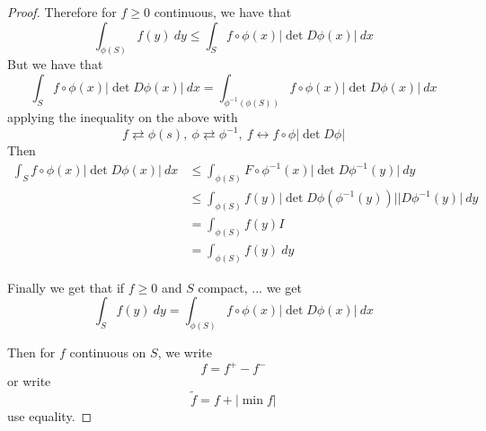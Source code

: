 \documentclass[11pt,a4paper]{article}
\theoremstyle{definition}
\theoremstyle{plain}
\theoremstyle{remark}
\newcommand{\abs}[1]{\lvert #1 \rvert}
\begin{document}
\begin{proof}
    Therefore for $f \ge 0$ continuous, we have that 
    $$\int_{\phi(S)} f(y) \ dy \le \int_S f \circ \phi(x) \abs{\det D\phi(x)} \ dx$$
    But we have that 
    $$\int_S f \circ \phi(x) \abs{\det D\phi(x)} \ dx = \int_{\phi^{-1} (\phi(S))} f \circ \phi(x) \abs{\det D\phi(x)} \ dx$$
    applying the inequality on the above with 
    $$f \rightleftarrows \phi(s), \ \phi \rightleftarrows \phi^{-1}, \ f \leftrightarrow f \circ \phi \abs{\det D\phi}$$
    Then
    \begin{align*}
        \int_S f \circ \phi(x) \abs{\det D\phi(x)} \ dx &\le \int_{\phi(S)} F \circ \phi^{-1} (x) \abs{\det D\phi^{-1}(y)} \ dy \\
        &\le \int_{\phi(S)} f(y) \abs{\det D\phi(\phi^{-1}(y))} \abs{D\phi^{-1}(y)} \ dy \\ 
        &= \int_{\phi(S)} f(y) I \\
        &= \int_{\phi(S)} f(y) \ dy
    \end{align*}
    
    Finally we get that if $f \ge 0$ and $S$ compact, ... we get 
    $$\int_S f(y) \ dy = \int_{\phi(S)} f \circ \phi(x) \abs{\det D\phi(x)} \ dx$$

    Then for $f$ continuous on $S$, we write 
    $$f = f^+ - f^-$$
    or write 
    $$\tilde{f} = f + \abs{\min f}$$
    use equality. 
\end{proof}
\end{document}
